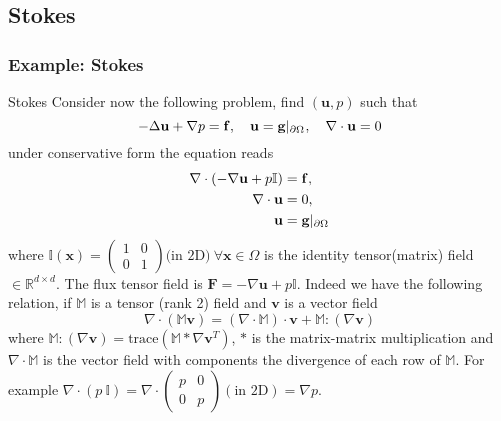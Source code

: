 \subsection{Stokes}
\subsubsection{Example: Stokes}
  \begin{remark}{Stokes}
    Consider now the following problem, find $(\mathbf{u},p)$ such that
    \begin{equation}
      \label{notes:eq:45}
      -\Delta \mathbf{u} + \nabla p  = \mathbf{f},\quad \mathbf{u} = \mathbf{g}|_{\partial {\ensuremath{\Omega^{}}}},\quad \nabla \cdot \mathbf{u} = 0
    \end{equation}
    under conservative form the equation reads
    \begin{eqnarray}
      \nabla \cdot ( -\nabla \mathbf{u} + p \mathbb{I} ) &= \mathbf{f},\label{notes:eq:8}\\
      \nabla \cdot \mathbf{u} &= 0,\label{notes:eq:10}\\
      \mathbf{u} &= \mathbf{g}|_{\partial {\ensuremath{\Omega^{}}}}\label{notes:eq:11}
    \end{eqnarray}
    where $\mathbb{I}(\mathbf{x})=
    \begin{pmatrix}
      1 & 0\\
      0 & 1
    \end{pmatrix}\text{(in 2D)}
    \ \forall \mathbf{x} \in \Omega$ is the identity tensor(matrix) field $\in
    \mathbb{R}^{d\times d}$. The flux tensor field is
    $\mathbf{F}=-\nabla \mathbf{u} + p\mathbb{I}$. Indeed we have  the
    following relation, if $\mathbb{M}$ is a tensor (rank 2) field and $\mathbf{v}$ is a vector field
    \begin{equation}
      \label{notes:eq:12}
      \nabla \cdot ( \mathbb{M} \mathbf{v} ) = (\nabla \cdot \mathbb{M}) \cdot \mathbf{v} + \mathbb{M} \colon (\nabla \mathbf{v})
    \end{equation}
    where $\mathbb{M} \colon (\nabla \mathbf{v}) =
    \mathrm{trace}(\mathbb{M}*\nabla \mathbf{v}^T)$, $*$ is the
    matrix-matrix multiplication and $\nabla \cdot \mathbb{M}$ is the
    vector field with components the divergence of each row of
    $\mathbb{M}$. For example $\nabla \cdot (p\ \mathbb{I})=\nabla \cdot
    \begin{pmatrix}
      p & 0 \\
      0 & p
    \end{pmatrix}(\text{in 2D}) =  \nabla p$.
  \end{remark}



